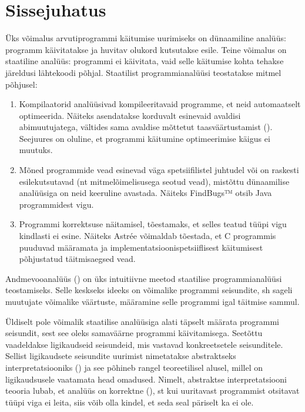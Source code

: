 \documentclass[../thesis.tex]{subfiles}
\begin{document}
\section*{Sissejuhatus}

Üks võimalus arvutiprogrammi käitumise uurimiseks on dünaamiline analüüs: programm käivitatakse ja huvitav olukord kutsutakse esile. Teine võimalus on staatiline analüüs: programmi ei käivitata, vaid selle käitumise kohta tehakse järeldusi lähtekoodi põhjal. Staatilist programmianalüüsi teostatakse mitmel põhjusel:
\begin{enumerate}
	\item Kompilaatorid analüüsivad kompileeritavaid programme, et neid automaatselt optimeerida. Näiteks asendatakse korduvalt esinevaid avaldisi abimuutujatega, vältides sama avaldise mõttetut taasväärtustamist (). Seejuures on oluline, et programmi käitumine optimeerimise käigus ei muutuks. 

	\item Mõned programmide vead esinevad väga spetsiifilistel juhtudel või on raskesti esilekutsutavad (nt mitmelõimelisusega seotud vead), mistõttu dünaamilise analüüsiga on neid keeruline avastada. Näiteks FindBugs™ otsib Java programmidest vigu.

	\item Programmi korrektsuse näitamisel, tõestamaks, et selles teatud tüüpi vigu kindlasti ei esine. Näiteks Astrée võimaldab tõestada, et C programmis puuduvad määramata ja implementatsioonispetsiiflisest käitumisest põhjustatud täitmisaegsed vead.
\end{enumerate}

Andmevooanalüüs () on üks intuitiivne meetod staatilise programmianalüüsi teostamiseks. Selle keskseks ideeks on võimalike programmi seisundite, sh sageli muutujate võimalike väärtuste, määramine selle programmi igal täitmise sammul.

Üldiselt pole võimalik staatilise analüüsiga alati täpselt määrata programmi seisundit, sest see oleks samaväärne programmi käivitamisega. Seetõttu vaadeldakse ligikaudseid seisundeid, mis vastavad konkreetsetele seisunditele. Sellist ligikaudsete seisundite uurimist nimetatakse abstraktseks interpretatsiooniks () ja see põhineb rangel teoreetilisel alusel, millel on ligikaudsusele vaatamata head omadused. Nimelt, abstraktse interpretatsiooni teooria lubab, et analüüs on korrektne (), st kui uuritavast programmist otsitavat tüüpi viga ei leita, siis võib olla kindel, et seda seal päriselt ka ei ole.
\end{document}
